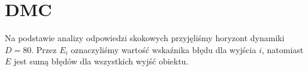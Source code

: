 \chapter{DMC}
Na podstawie analizy odpowiedzi skokowych przyjęliśmy horyzont dynamiki $D=80$. Przez $E_i$ oznaczyliśmy wartość wskaźnika błędu dla wyjścia $i$, natomiast $E$ jest sumą błędów dla wszystkich wyjść obiektu.


